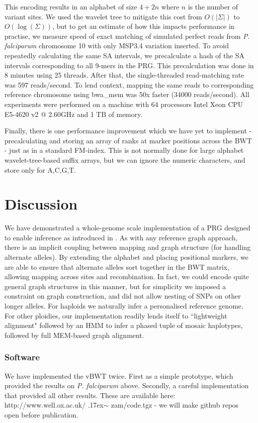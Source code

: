 \documentclass[runningheads,a4paper]{llncs}
\begin{document}
This encoding results in an alphabet of size $4+2n$ where $n$ is the number of variant sites. We used the wavelet tree to mitigate this cost from $O(|\Sigma|)$ to $O(\log(\Sigma))$, but to get an estimate of how this impacts performance in practise, we measure speed of exact matching of simulated perfect reads from \textit{P. falciparum} chromosome 10 with only MSP3.4 variation inserted. To avoid repeatedly calculating the same SA intervals, we precalculate a hash of the  SA intervals corresponding to all 9-mers in the PRG. This precalculation was done in 8 minutes using 25 threads. After that, the single-threaded read-matching rate was 597 reads/second. To lend context, mapping the same reads to corresponding reference chromosome using bwa\_mem was 50x faster (34000 reads/second). All experiments were performed on a machine with 64 processors Intel Xeon CPU E5-4620 v2 @ 2.60GHz and 1 TB of memory.

Finally, there is one performance improvement which we have yet to implement - precalculating and storing an array of ranks at marker positions across the BWT - just as in a standard FM-index. This is not normally done for large alphabet wavelet-tree-based suffix arrays, but we can ignore the numeric characters, and store only for A,C,G,T. 

\section{Discussion}
We have demonstrated a whole-genome scale implementation of a PRG designed to enable inference as introduced in \cite{dilthey}. As with any reference graph approach, there is an implicit coupling between mapping and graph structure (for handling alternate alleles). By extending the alphabet and placing positional markers, we are able to ensure that alternate alleles sort together in the BWT matrix, allowing mapping across sites and recombination. In fact, we could encode quite general graph structures in this manner, but for simplicity we imposed a constraint on graph construction, and did not allow nesting of SNPs on other longer alleles. For haploids we naturally infer a personalised reference genome. For other ploidies, our implementation readily lends itself to ``lightweight alignment" followed by an HMM to infer a phased tuple of mosaic haplotypes, followed by full MEM-based graph alignment.  





\subsubsection{Software}
We have implemented the vBWT twice. First as a simple prototype, which provided the results on \textit{P. falciparum} above. Secondly,  a careful implementation that provided all other results. These are available here: http://www.well.ox.ac.uk/ {\raise.17ex\hbox{$\scriptstyle\sim$}} zam/code.tgz -  we will make github repos open before publication. 
\end{document}
